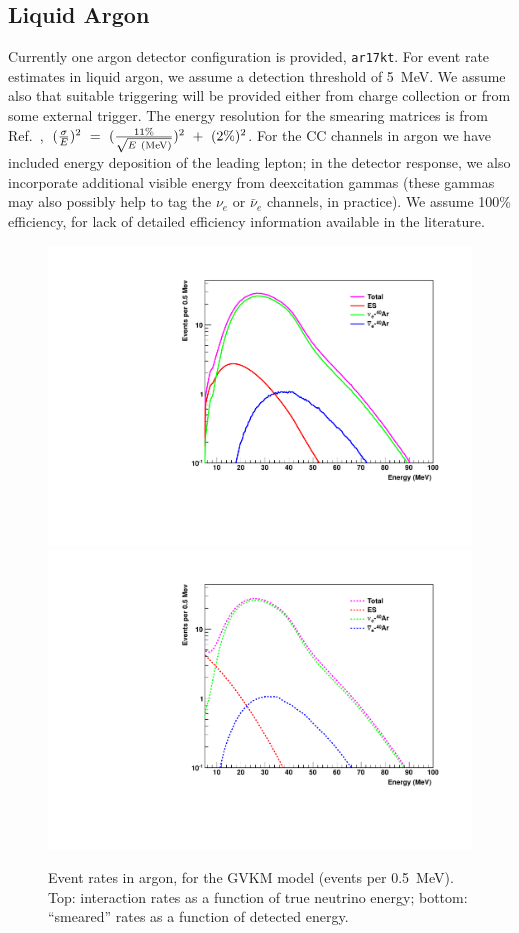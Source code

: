 \documentclass[12pt]{article}
\begin{document}
\subsection{Liquid Argon}

Currently one argon detector configuration is provided,
\texttt{ar17kt}.  For event rate estimates in liquid argon, we assume
a detection threshold of 5~MeV.  We assume also that suitable
triggering will be provided either from charge collection or from some
external trigger.  The energy resolution for the smearing matrices is
from Ref.~\cite{Amoruso:2003sw},~$(\frac{\sigma}{E})^{2}~=~(\frac{11\%}{\sqrt{E~({\rm MeV})}})^{2}~+~(2\%)^{2}$.
For the CC channels in argon we have included energy deposition of the
leading lepton; in the detector response, we also incorporate
additional visible energy from deexcitation gammas (these gammas may
also possibly help to tag the $\nu_e$ or $\bar{\nu}_e$ channels,
in practice).  We assume 100\%
efficiency, for lack of detailed efficiency information available in
the literature.


\begin{figure}[htb]
  \centering\includegraphics[width=.75\textwidth]{figures/interaction_rates_gvkm_ar17kt.pdf}
  \centering\includegraphics[width=.75\textwidth]{figures/smeared_rates_gvkm_ar17kt.pdf}

  \caption{Event rates in argon, for the GVKM model (events per 0.5~MeV). Top: interaction rates as a
    function of true neutrino energy; bottom:  ``smeared''
    rates as a function of detected energy.}
  \label{fig:larrates}
\end{figure}
\end{document}
